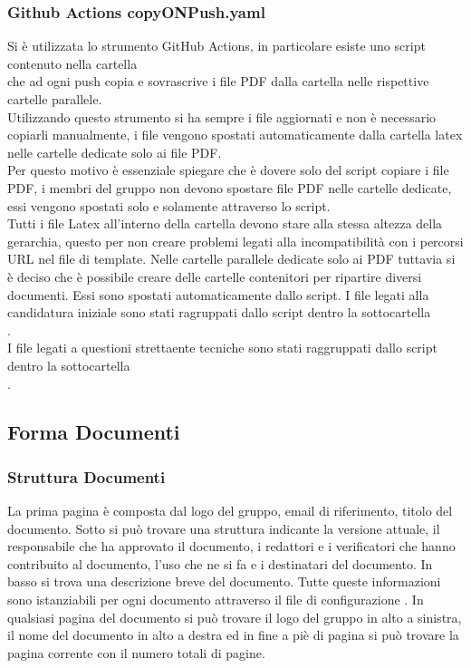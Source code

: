 \subsubsection{Github Actions copyONPush.yaml}
Si è utilizzata lo strumento GitHub Actions, in particolare esiste uno script contenuto nella cartella\\
 che ad ogni push copia e sovrascrive
i file PDF dalla cartella  nelle rispettive cartelle parallele.\\
Utilizzando questo strumento si ha sempre i file aggiornati e non è necessario copiarli manualmente, i file vengono spostati automaticamente dalla cartella latex nelle cartelle dedicate solo
ai file PDF.\\
Per questo motivo è essenziale spiegare che è dovere solo del script copiare i file PDF, i membri del gruppo non devono spostare file PDF nelle cartelle dedicate, essi vengono spostati solo e solamente attraverso 
lo script.\\
Tutti i file Latex all'interno della cartella  devono stare alla stessa altezza della gerarchia, questo per non creare problemi legati alla incompatibilità 
con i percorsi URL nel file di template.
Nelle cartelle parallele dedicate solo ai PDF tuttavia si è deciso che è possibile creare delle cartelle contenitori per ripartire diversi documenti.
Essi sono spostati automaticamente dallo script.
I file legati alla candidatura iniziale sono stati ragruppati dallo script dentro
la sottocartella\\
.\\
I file legati a questioni strettaente tecniche sono stati raggruppati dallo script dentro la sottocartella\\
.

\subsection{Forma Documenti}
\subsubsection{Struttura Documenti}\label{strutturaDocumenti}
La prima pagina è composta dal logo del gruppo, email di riferimento, titolo del documento.
Sotto si può trovare una struttura indicante la versione attuale, il responsabile che ha approvato il documento, i redattori e i verificatori che hanno contribuito al documento, l'uso che ne si fa e i destinatari del documento.
In basso si trova una descrizione breve del documento.
Tutte queste informazioni sono istanziabili per ogni documento attraverso il file di configurazione .
In qualsiasi pagina del documento si può trovare il logo del gruppo in alto a sinistra, il nome del documento in alto a destra ed in fine a piè di pagina si può trovare la pagina corrente con il numero totali di pagine.

